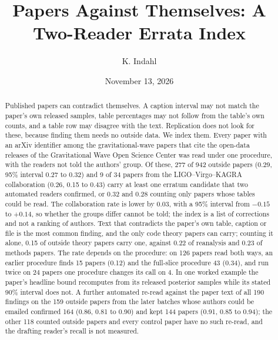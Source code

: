 \documentclass[reprint,amsmath,amssymb,aps,superscriptaddress,nofootinbib]{revtex4-2}
\begin{document}
\title{Papers Against Themselves: A Two-Reader Errata Index}

\author{K. Indahl}

\date{November 13, 2026}

\begin{abstract}
Published papers can contradict themselves. A caption interval may not match the paper's own released samples, table percentages may not follow from the table's own counts, and a table row may disagree with the text. Replication does not look for these, because finding them needs no outside data. We index them. Every paper with an arXiv identifier among the gravitational-wave papers that cite the open-data releases of the Gravitational Wave Open Science Center was read under one procedure, with the readers not told the authors' group. Of these, 277 of 942 outside papers (0.29, 95\% interval 0.27 to 0.32) and 9 of 34 papers from the LIGO--Virgo--KAGRA collaboration (0.26, 0.15 to 0.43) carry at least one erratum candidate that two automated readers confirmed, or 0.32 and 0.28 counting only papers whose tables could be read. The collaboration rate is lower by 0.03, with a 95\% interval from $-0.15$ to $+0.14$, so whether the groups differ cannot be told; the index is a list of corrections and not a ranking of authors. Text that contradicts the paper's own table, caption or file is the most common finding, and the only code theory papers can carry; counting it alone, 0.15 of outside theory papers carry one, against 0.22 of reanalysis and 0.23 of methods papers. The rate depends on the procedure: on 126 papers read both ways, an earlier procedure finds 15 papers (0.12) and the full-slice procedure 43 (0.34), and run twice on 24 papers one procedure changes its call on 4. In one worked example the paper's headline bound recomputes from its released posterior samples while its stated 90\% interval does not. A further automated re-read against the paper text of all 190 findings on the 159 outside papers from the later batches whose authors could be emailed confirmed 164 (0.86, 0.81 to 0.90) and kept 144 papers (0.91, 0.85 to 0.94); the other 118 counted outside papers and every control paper have no such re-read, and the drafting reader's recall is not measured.
\end{abstract}

\maketitle
\end{document}
